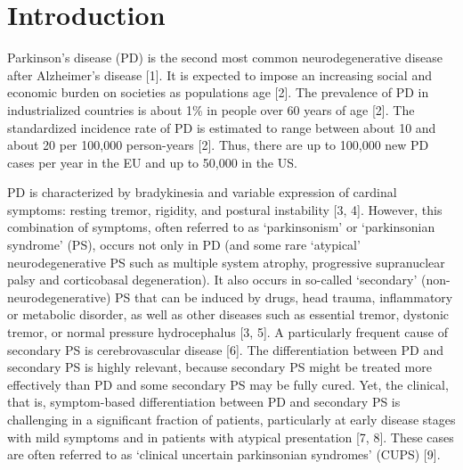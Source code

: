 \section{Introduction}
\label{sec:intro}


Parkinson's disease (PD) is the second most common neurodegenerative disease after Alzheimer's disease [1]. 
It is expected to impose an increasing social and economic burden on societies as populations age [2]. 
The prevalence of PD in industrialized countries is about 1\% in people over 60 years of age [2]. 
The standardized incidence rate of PD is estimated to range between about 10 and about 20 per 100,000 person-years [2]. 
Thus, there are up to 100,000 new PD cases per year in the EU and up to 50,000 in the US.


PD is characterized by bradykinesia and variable expression of cardinal symptoms: resting tremor, rigidity, and postural instability [3, 4]. 
However, this combination of symptoms, often referred to as `parkinsonism' or `parkinsonian syndrome' (PS), 
occurs not only in PD (and some rare `atypical' neurodegenerative PS such as multiple system atrophy, progressive 
supranuclear palsy and corticobasal degeneration). 
It also occurs in so-called `secondary' (non-neurodegenerative) PS that can be induced by drugs, head trauma, 
inflammatory or metabolic disorder, as well as other diseases such as essential tremor, dystonic tremor, or normal pressure hydrocephalus [3, 5]. 
A particularly frequent cause of secondary PS is cerebrovascular disease [6]. 
The differentiation between PD and secondary PS is highly relevant, 
because secondary PS might be treated more effectively than PD and some secondary PS may be fully cured.
Yet, the clinical, that is, symptom-based differentiation between PD and secondary PS is challenging in a significant fraction of patients, 
particularly at early disease stages with mild symptoms and in patients with atypical presentation [7, 8]. 
These cases are often referred to as `clinical uncertain parkinsonian syndromes' (CUPS) [9].


